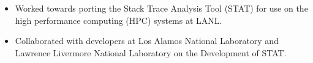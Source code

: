 \documentclass[10pt,letterpaper]{article}
\begin{document}
\begin{itemize}
\begin{itemize}

	\item Worked towards porting the Stack Trace Analysis Tool (STAT) for
	use on the high performance computing (HPC) systems at LANL.

	\item Collaborated with developers at Los Alamos National Laboratory
	and Lawrence Livermore National Laboratory on the Development of STAT.

\end{itemize}

%















\end{itemize}
\end{document}
